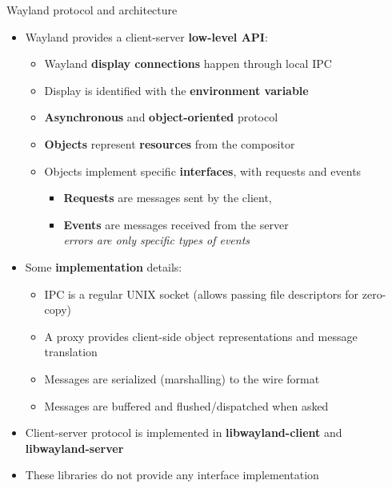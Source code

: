 \begin{frame}{Wayland protocol and architecture}
  \begin{itemize}
  \item Wayland provides a client-server \textbf{low-level API}:
    \begin{itemize}
    \item Wayland \textbf{display connections} happen through local IPC
    \item Display is identified with the  \textbf{environment variable}
    \item \textbf{Asynchronous} and \textbf{object-oriented} protocol
    \item \textbf{Objects} represent \textbf{resources} from the compositor
    \item Objects implement specific \textbf{interfaces}, with requests and events
      \begin{itemize}
      \item \textbf{Requests} are messages sent by the client, 
      \item \textbf{Events} are messages received from the server\\
        \textit{errors are only specific types of events}
      \end{itemize}
    \end{itemize}
  \item Some \textbf{implementation} details:
    \begin{itemize}
    \item IPC is a regular UNIX socket (allows passing file descriptors for zero-copy)
    \item A proxy provides client-side object representations and message translation
    \item Messages are serialized (marshalling) to the wire format
    \item Messages are buffered and flushed/dispatched when asked
    \end{itemize}
  \item Client-server protocol is implemented in \textbf{libwayland-client} and \textbf{libwayland-server}
  \item These libraries do not provide any interface implementation
  \end{itemize}
\end{frame}

